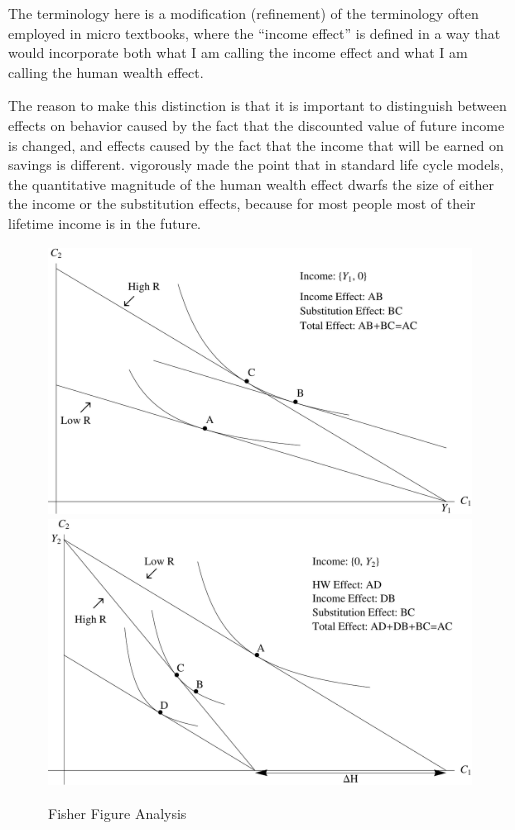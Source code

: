 \documentclass{scrartcl}
\begin{document}
  The terminology here is a modification (refinement) of the terminology often employed in micro textbooks, where the ``income effect'' is defined in a way that would incorporate both what I am calling the income effect and what I am calling the human wealth effect.

  The reason to make this distinction is that it is important to distinguish between effects on behavior caused by the fact that the discounted value of future income is changed, and effects caused by the fact that the income that will be earned on savings is different.
  \cite{summersCapTax} vigorously made the point that in standard life cycle models, the quantitative magnitude of the human wealth effect dwarfs the size of either the income or the substitution effects, because for most people most of their lifetime income is in the future.

  \begin{figure}
    \caption{Fisher Figure Analysis}\label{fig:Fisher} \includegraphics[width=6in]{./Figures/FisherFigureY1} \includegraphics[width=6in]{./Figures/FisherFigureY2}
  \end{figure}



\end{document}
